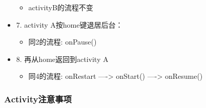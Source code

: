 \documentclass[9pt, b5paper]{article}
\begin{document}
\begin{itemize}
\begin{itemize}
\item activityB的流程不变
\end{itemize}
\item 7. activity A按home键退居后台：
\begin{itemize}
\item 同2的流程: onPause()
\end{itemize}
\item 8. 再从home返回到activity A
\begin{itemize}
\item 同4的流程: onRestart ----> onStart() ----> onResume()
\end{itemize}
\end{itemize}

\subsubsection{Activity注意事项}
\label{sec-1-1-3}
\end{document}
